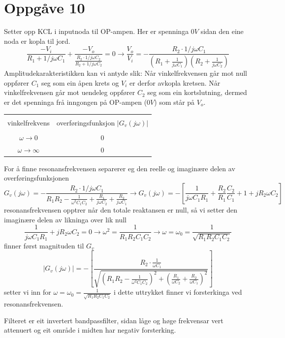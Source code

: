 \documentclass[12pt,a4paper]{article}
\begin{document}
  \section*{Oppgåve 10}
    Setter opp KCL i inputnoda til OP-ampen. Her er spenninga $0V$ sidan den eine
    noda er kopla til jord.
    \begin{equation}
      \frac{-V_i}{R_1 + 1/j\omega C_1} +
      \frac{-V_o}{\frac{R_2\cdot 1/j\omega C_2}{R_2 + 1/j\omega C_2}} = 0
      \rightarrow \frac{V_o}{V_i} = -\frac{R_2\cdot 1/j\omega C_1}
      {\left( R_1 + \frac{1}{j\omega C_1} \right) \left( R_2 + \frac{1}{j\omega C_2} \right)}
    \end{equation}
    Amplitudekarakteristikken kan vi antyde slik: Når vinkelfrekvensen går mot null
    oppfører $C_1$ seg som ein åpen krets og $V_i$ er derfor avkopla kretsen. Når
    vinkelfrekvensen går mot uendeleg oppfører $C_2$ seg som ein kortslutning, dermed er det
    spenninga frå inngongen på OP-ampen ($0V$) som står på $V_o$.
    \begin{center}
      \begin{tabular}{|c|c|}
        \hline
         & \\
        vinkelfrekvens & overføringsfunksjon $|G_v(j\omega)|$ \\
         & \\
        \hline
        $\omega \rightarrow 0$ & 0 \\
        \hline
        $\omega \rightarrow \infty$ & 0 \\
        \hline
      \end{tabular}
    \end{center}
    For å finne resonansfrekvensen separerer eg den reelle og imaginære delen av 
    overføringsfunksjonen
    \begin{equation}
      G_v(j\omega) = - \frac{R_2 \cdot 1/j\omega C_1}
      {R_1R_2 - \frac{1}{\omega^2C_1C_2} + \frac{R_1}{j\omega C_2} + \frac{R_2}{j\omega C_1}}
      \rightarrow G_v(j\omega) = 
      - \left[ \frac{1}{j\omega C_1R_1} + \frac{R_2}{R_1}\frac{C_2}{C_1}
      + 1 + jR_2\omega C_2 \right]
    \end{equation}
    resonansfrekvensen opptrer når den totale reaktansen er null, så vi setter den imaginære
    delen av likninga over lik null
    \begin{equation}
      \frac{1}{j\omega C_1R_1} + jR_2\omega C_2 = 0 \rightarrow
      \omega ^2 = \frac{1}{R_1R_2C_1C_2} \rightarrow
      \omega = \omega _0 = \frac{1}{\sqrt{R_1R_2C_1C_2}}
    \end{equation}
    finner først magnituden til $G_v$
    \begin{equation}
      |G_v(j\omega)| = - \left[ \frac{R_2 \cdot\frac{1}{\omega C_1}}
      {\sqrt{ \left(R_1R_2 - \frac{1}{\omega ^2 C_1C_2} \right)^2 +
              \left(\frac{R_1}{\omega C_2} + \frac{R_2}{\omega C_1} \right)^2}} \right]
    \end{equation}
    setter vi inn for $\omega = \omega _0 = \frac{1}{\sqrt{R_1R_2C_1C_2}}$ i dette uttrykket
    finner vi forsterkinga ved resonansfrekvensen.

    \bigskip

    Filteret er eit invertert bandpassfilter, sidan låge og høge frekvensar vert
    attenuert og eit område i midten har negativ forsterking.
\end{document}
